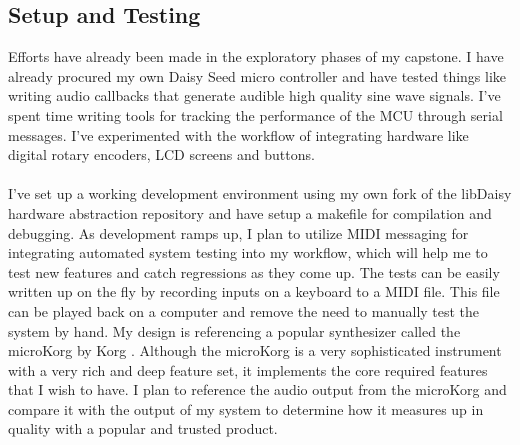 \documentclass[12pt]{article}
\begin{document}
\subsection{Setup and Testing}
Efforts have already been made in the exploratory phases of my capstone. I have already procured my own Daisy Seed micro controller and have tested things like writing audio callbacks that generate audible high quality sine wave signals. I’ve spent time writing tools for tracking the performance of the MCU through serial messages. I’ve experimented with the workflow of integrating hardware like digital rotary encoders, LCD screens and buttons.\\\\
I’ve set up a working development environment using my own fork of the libDaisy hardware abstraction repository and have setup a makefile for compilation and debugging. As development ramps up, I plan to utilize MIDI messaging for integrating automated system testing into my workflow, which will help me to test new features and catch regressions as they come up. The tests can be easily written up on the fly by recording inputs on a keyboard to a MIDI file. This file can be played back on a computer and remove the need to manually test the system by hand. My design is referencing a popular synthesizer called the microKorg by Korg \cite{ward_2003}. Although the microKorg is a very sophisticated instrument with a very rich and deep feature set, it implements the core required features that I wish to have. I plan to reference the audio output from the microKorg and compare it with the output of my system to determine how it measures up in quality with a popular and trusted product.
\pagebreak
\end{document}
